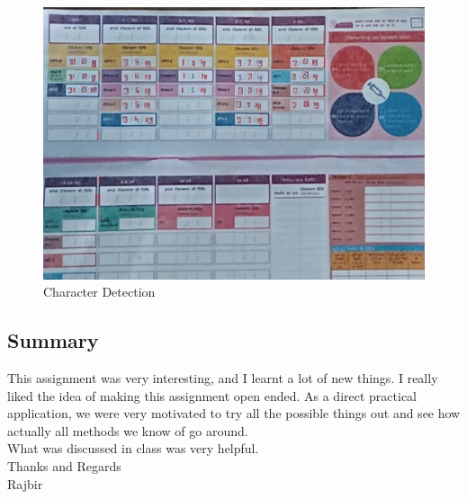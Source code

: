 \documentclass{article}
\begin{document}
    \begin{figure}[!htb]
    \minipage{\textwidth}
    \begin{center}
      \includegraphics[scale=.25]{4/.report/_char/b2.jpg}
      \caption{Character Detection}
    \end{center}
    \endminipage
    \end{figure}
\pagebreak
\subsection*{Summary}
    This assignment was very interesting, and I learnt a lot of new things.
    I really liked the idea of making this assignment open ended. As a direct practical application, we were very motivated to try all the possible things out and see how actually all methods we know of go around. \\
    What was discussed in class was very helpful. \\
    Thanks and Regards\\
    Rajbir
\end{document}
